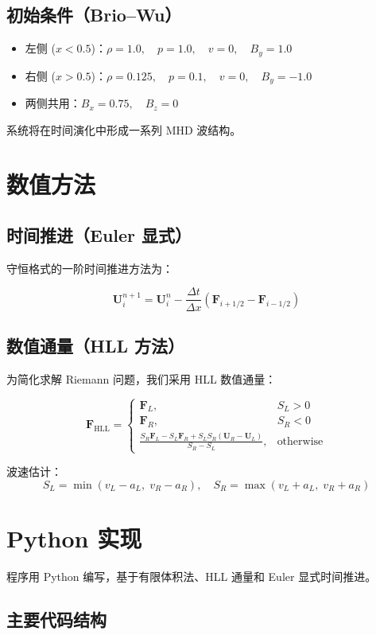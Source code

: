 \documentclass[12pt]{article}
\begin{document}
\subsection*{初始条件（Brio–Wu）}

\begin{itemize}
    \item 左侧 ($x < 0.5$)：$\rho = 1.0,\quad p = 1.0,\quad v = 0,\quad B_y = 1.0$
    \item 右侧 ($x > 0.5$)：$\rho = 0.125,\quad p = 0.1,\quad v = 0,\quad B_y = -1.0$
    \item 两侧共用：$B_x = 0.75,\quad B_z = 0$
\end{itemize}

系统将在时间演化中形成一系列 MHD 波结构。

\section{数值方法}

\subsection*{时间推进（Euler 显式）}
守恒格式的一阶时间推进方法为：

\[
\bm{U}_i^{n+1} = \bm{U}_i^n - \frac{\Delta t}{\Delta x} \left( \bm{F}_{i+1/2} - \bm{F}_{i-1/2} \right)
\]

\subsection*{数值通量（HLL 方法）}
为简化求解 Riemann 问题，我们采用 HLL 数值通量：

\[
\bm{F}_{\text{HLL}} =
\begin{cases}
\bm{F}_L, & S_L > 0 \\
\bm{F}_R, & S_R < 0 \\
\frac{S_R \bm{F}_L - S_L \bm{F}_R + S_L S_R (\bm{U}_R - \bm{U}_L)}{S_R - S_L}, & \text{otherwise}
\end{cases}
\]

波速估计：
\[
S_L = \min(v_L - a_L,\; v_R - a_R), \quad
S_R = \max(v_L + a_L,\; v_R + a_R)
\]

\section{Python 实现}

程序用 Python 编写，基于有限体积法、HLL 通量和 Euler 显式时间推进。

\subsection*{主要代码结构}
\end{document}
